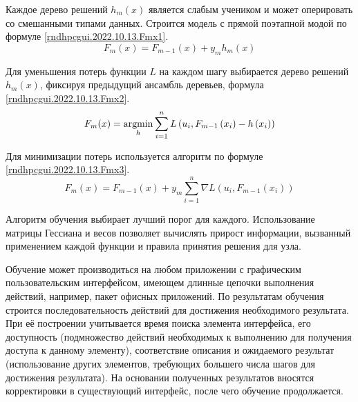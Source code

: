 Каждое дерево решений $h_m(x)$ является слабым учеником и может оперировать со смешанными типами данных. Строится модель с прямой поэтапной модой по формуле \eqref{rndhpcgui.2022.10.13.Fmx1}.
\begin{equation}\label{rndhpcgui.2022.10.13.Fmx1}
   F_m(x)=F_{m-1}(x)+y_m h_m(x)
\end{equation}

Для уменьшения потерь функции $L$ на каждом шагу выбирается дерево решений $h_m(x)$, фиксируя предыдущий ансамбль деревьев, формула \eqref{rndhpcgui.2022.10.13.Fmx2}.
\begin{equation}\label{rndhpcgui.2022.10.13.Fmx2}
   F_m(x)=\argmin\limits_h \sum_{i=1}^n L\left(u_i, F_{m-1}\left(x_i\right)-h\left(x_i\right)\right)
\end{equation}

Для минимизации потерь используется алгоритм по формуле \ref{rndhpcgui.2022.10.13.Fmx3}.
\begin{equation}\label{rndhpcgui.2022.10.13.Fmx3}
   F_m(x)=F_{m-1}(x)+y_m \sum_{i=1}^n \nabla L\left(u_i, F_{m-1}\left(x_i\right)\right)
\end{equation}

Алгоритм обучения выбирает лучший порог для каждого. Использование матрицы Гессиана и весов позволяет вычислять прирост информации, вызванный применением каждой функции и правила принятия решения для узла.
	
Обучение может производиться на любом приложении с графическим пользовательским интерфейсом, имеющем длинные цепочки выполнения действий, например, пакет офисных приложений. По результатам обучения строится последовательность действий для достижения необходимого результата. При её построении учитывается время поиска элемента интерфейса, его доступность (подмножество действий необходимых к выполнению для получения доступа к данному элементу), соответствие описания и ожидаемого результат (использование других элементов, требующих большего числа шагов для достижения результата). На основании полученных результатов вносятся корректировки в существующий интерфейс, после чего обучение продолжается.
\noteattributes{}


